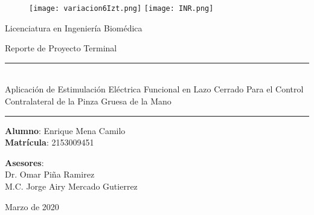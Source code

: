 \begin{titlepage}
\begin{center}

\begin{figure}
	\centering
	\texttt{[image: variacion6Izt.png]}
	\hfill
	\texttt{[image: INR.png]}
\end{figure}
\vspace*{\fill}

\LARGE{Licenciatura en Ingeniería Biomédica}

\LARGE{Reporte de Proyecto Terminal}

\vspace*{\fill}

\rule{16.5cm}{0.5mm}\\
\LARGE{Aplicación de Estimulación Eléctrica Funcional en Lazo Cerrado Para el Control Contralateral de la Pinza Gruesa de la Mano}\\
\rule{16.5cm}{0.5mm}

\vspace*{\fill}

\LARGE{	\textbf{Alumno}: Enrique Mena Camilo\\
		\textbf{Matrícula}: 2153009451\\}

\vspace*{\fill}

\LARGE{\textbf{Asesores}:\\Dr. Omar Piña Ramirez\\M.C. Jorge Airy Mercado Gutierrez}

\vspace*{\fill}

\Large{Marzo de 2020}

\end{center}
\end{titlepage}